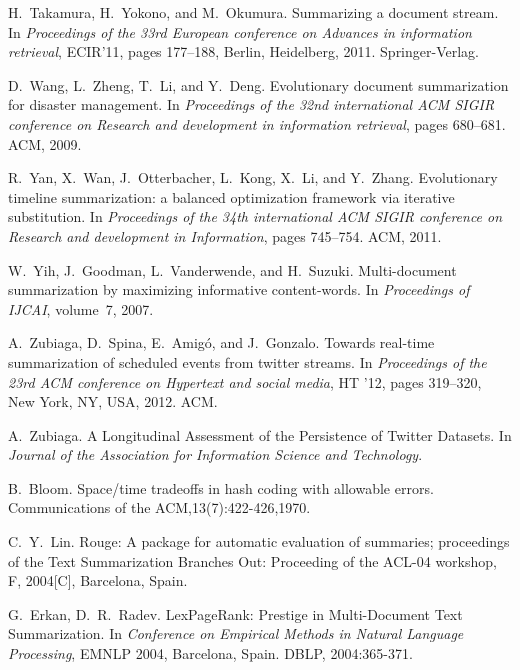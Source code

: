 \documentclass[envcountsame]{llncs}
\begin{document}
\begin{thebibliography}{10}
H.~Takamura, H.~Yokono, and M.~Okumura.
\newblock Summarizing a document stream.
\newblock In {\em Proceedings of the 33rd European conference on Advances in
  information retrieval}, ECIR'11, pages 177--188, Berlin, Heidelberg, 2011.
  Springer-Verlag.

D.~Wang, L.~Zheng, T.~Li, and Y.~Deng.
\newblock Evolutionary document summarization for disaster management.
\newblock In {\em Proceedings of the 32nd international ACM SIGIR conference on
  Research and development in information retrieval}, pages 680--681. ACM,
  2009.

R.~Yan, X.~Wan, J.~Otterbacher, L.~Kong, X.~Li, and Y.~Zhang.
\newblock Evolutionary timeline summarization: a balanced optimization
  framework via iterative substitution.
\newblock In {\em Proceedings of the 34th international ACM SIGIR conference on
  Research and development in Information}, pages 745--754. ACM, 2011.

W.~Yih, J.~Goodman, L.~Vanderwende, and H.~Suzuki.
\newblock Multi-document summarization by maximizing informative content-words.
\newblock In {\em Proceedings of IJCAI}, volume~7, 2007.

A.~Zubiaga, D.~Spina, E.~Amig\'{o}, and J.~Gonzalo.
\newblock Towards real-time summarization of scheduled events from twitter
  streams.
\newblock In {\em Proceedings of the 23rd ACM conference on Hypertext and
  social media}, HT '12, pages 319--320, New York, NY, USA, 2012. ACM.

A.~Zubiaga.
\newblock A Longitudinal Assessment of the Persistence of Twitter Datasets.
\newblock In {\em Journal of the Association for Information Science and Technology}.

B.~Bloom.
\newblock Space/time tradeoffs in hash coding with allowable errors.
\newblock Communications of the ACM,13(7):422-426,1970.

C.~Y.~Lin.
\newblock Rouge: A package for automatic evaluation of summaries;
\newblock proceedings of the Text Summarization Branches Out: Proceeding of the ACL-04 workshop, F, 2004[C], Barcelona, Spain.

G.~Erkan, D.~R.~Radev.
\newblock LexPageRank: Prestige in Multi-Document Text Summarization.
\newblock In {\em Conference on Empirical Methods in Natural Language Processing}, EMNLP 2004, Barcelona, Spain. DBLP, 2004:365-371.


\end{thebibliography}
\end{document}
